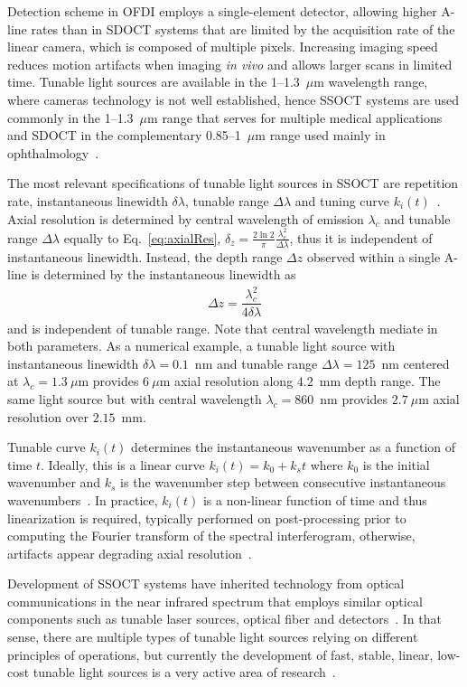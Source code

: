 Detection scheme in OFDI employs a single-element detector, allowing higher A-line rates than in SDOCT systems that are limited by the acquisition rate of the linear camera, which is composed of multiple pixels. Increasing imaging speed reduces motion artifacts when imaging \textit{in vivo} and allows larger scans in limited time. Tunable light sources are available in the 1--1.3~$\mu$m wavelength range, where cameras technology is not well established, hence SSOCT systems are used commonly in the 1--1.3~$\mu$m range that serves for multiple medical applications and SDOCT in the complementary 0.85--1~$\mu$m range used mainly in ophthalmology~\cite{Fujimoto2015_Introduction}.

The most relevant specifications of tunable light sources in SSOCT are repetition rate, instantaneous linewidth $\delta\lambda$, tunable range $\Delta\lambda$ and tuning curve $k_i(t)$~\cite{Yun2015_Wavelength}. Axial resolution is determined by central wavelength of emission $\lambda_c$ and tunable range $\Delta\lambda$ equally to Eq.~\ref{eq:axialRes}, $\delta_z = \frac{2\ln 2}{\pi}\frac{\lambda_c^2}{\Delta\lambda}$, thus it is independent of instantaneous linewidth. Instead, the depth range $\Delta z$ observed within a single A-line is determined by the instantaneous linewidth as
\begin{align}
\Delta z = \dfrac{\lambda_c^2}{4\delta\lambda}
\end{align}
and is independent of tunable range. Note that central wavelength mediate in both parameters. As a numerical example, a tunable light source with instantaneous linewidth $\delta\lambda=0.1$~nm and tunable range $\Delta\lambda=125$~nm centered at $\lambda_c=1.3~\mu$m provides $6~\mu$m axial resolution along $4.2$~mm depth range. The same light source but with central wavelength $\lambda_c=860$~nm provides $2.7~\mu$m axial resolution over $2.15$~mm.

Tunable curve $k_i(t)$ determines the instantaneous wavenumber as a function of time $t$. Ideally, this is a linear curve $k_i(t) = k_0 + k_st$ where $k_0$ is the initial wavenumber and $k_s$ is the wavenumber step between consecutive instantaneous wavenumbers~\cite{Dorrer2000_Spectral}. In practice, $k_i(t)$ is a non-linear function of time and thus linearization is required, typically performed on post-processing prior to computing the Fourier transform of the spectral interferogram, otherwise, artifacts appear degrading axial resolution~\cite{Dorrer2000_Spectral}.

Development of SSOCT systems have inherited technology from optical communications in the near infrared spectrum that employs similar optical components such as tunable laser sources, optical fiber and detectors~\cite{Yariv2007_Photonics}. In that sense, there are multiple types of tunable light sources relying on different principles of operations, but currently the development of fast, stable, linear, low-cost tunable light sources is a very active area of research~\cite{YasinAlibhai2018_Swept}.

